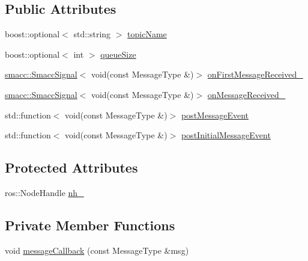 \subsection*{Public Attributes}
\begin{DoxyCompactItemize}
\item 
boost\+::optional$<$ std\+::string $>$ \hyperlink{classsmacc_1_1components_1_1CpTopicSubscriber_a90e61b81d9bb33b886162eb41051fe1c}{topic\+Name}
\item 
boost\+::optional$<$ int $>$ \hyperlink{classsmacc_1_1components_1_1CpTopicSubscriber_ad8775c1e5773a2c58d63ad2d64d28580}{queue\+Size}
\item 
\hyperlink{classsmacc_1_1SmaccSignal}{smacc\+::\+Smacc\+Signal}$<$ void(const Message\+Type \&)$>$ \hyperlink{classsmacc_1_1components_1_1CpTopicSubscriber_ab8e319857951489298faefa4882e49cc}{on\+First\+Message\+Received\+\_\+}
\item 
\hyperlink{classsmacc_1_1SmaccSignal}{smacc\+::\+Smacc\+Signal}$<$ void(const Message\+Type \&)$>$ \hyperlink{classsmacc_1_1components_1_1CpTopicSubscriber_aeec04e64cad880bd49d401c2a474c6e9}{on\+Message\+Received\+\_\+}
\item 
std\+::function$<$ void(const Message\+Type \&)$>$ \hyperlink{classsmacc_1_1components_1_1CpTopicSubscriber_a002ca59f74f784f14597d1c0e057d298}{post\+Message\+Event}
\item 
std\+::function$<$ void(const Message\+Type \&)$>$ \hyperlink{classsmacc_1_1components_1_1CpTopicSubscriber_a9e1c210ebc8d5ef0c837e8bd9b83f754}{post\+Initial\+Message\+Event}
\end{DoxyCompactItemize}
\subsection*{Protected Attributes}
\begin{DoxyCompactItemize}
\item 
ros\+::\+Node\+Handle \hyperlink{classsmacc_1_1components_1_1CpTopicSubscriber_aee3369aec5cf88918bf1e812b3d68dd6}{nh\+\_\+}
\end{DoxyCompactItemize}
\subsection*{Private Member Functions}
\begin{DoxyCompactItemize}
\item 
void \hyperlink{classsmacc_1_1components_1_1CpTopicSubscriber_af1b8b4e1c2fe22ac3ea2968a9a957d8f}{message\+Callback} (const Message\+Type \&msg)
\end{DoxyCompactItemize}
